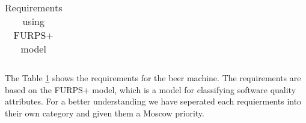 \begin{center}
\begin{longtable}{|c|p{3.5cm}|p{7cm}|c|}
        \caption[longtable]{Requirements using FURPS+ model}
        \label{tab:requirements}
    \end{longtable}
\end{center}

The Table \ref{tab:requirements} shows the requirements for the beer machine. The requirements are based on the FURPS+ model, which is a model for classifying software quality attributes. For a better understanding we have seperated each requierments into their own category and given them a Moscow priority.







